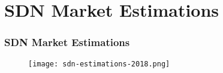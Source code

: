 \section{SDN Market Estimations}

\begin{frame}[allowframebreaks]
\frametitle{SDN Market Estimations}

\begin{center}
  \begin{figure}
    \texttt{[image: sdn-estimations-2018.png]}
  \end{figure}
\end{center}

\end{frame}
